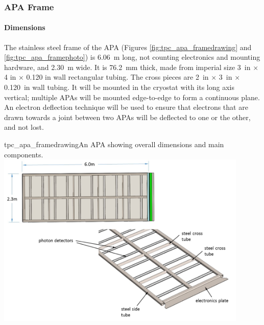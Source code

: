 \subsubsection{APA Frame}
\label{subsec:apa_frame}

\paragraph{Dimensions}

The stainless steel frame of the APA (Figures \ref{fig:tpc_apa_framedrawing} and \ref{fig:tpc_apa_framephoto}) is 6.06~m long, not counting electronics and mounting hardware, and 2.30~m wide.  It is 76.2~mm thick, made from imperial size 3~in $\times$ 4 in $\times$ 0.120 in wall rectangular tubing.  The cross pieces are 2~in $\times$ 3~in $\times$ 0.120~in wall tubing.  It will be mounted in the cryostat with its long axis vertical; multiple APAs will be mounted edge-to-edge to form a continuous plane. An electron deflection technique will be used to ensure that electrons that are drawn towards a joint between two APAs will be deflected to one or the other, and not lost.

\begin{cdrfigure}{tpc_apa_framedrawing}{An APA showing overall dimensions and main components.}
\includegraphics[width=0.9\textwidth]{figures/tpc_apa_framedrawing.png} 
\end{cdrfigure}

